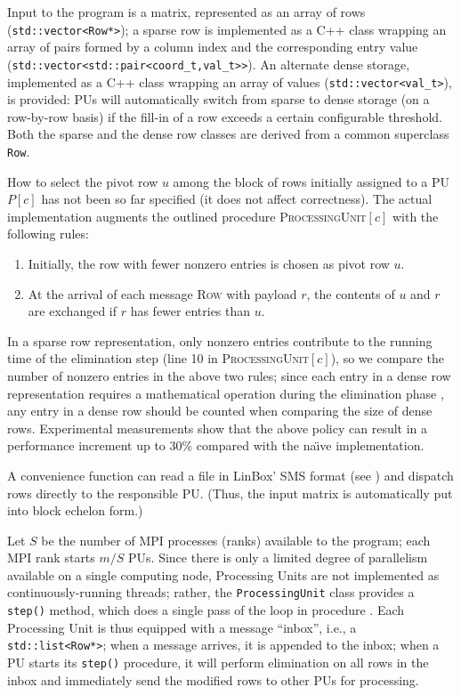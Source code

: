 Input to the program is a matrix, represented as an array of
rows (\verb"std::vector<Row*>"); a sparse row is implemented as a C++
class wrapping an array of pairs formed by a column index and the
corresponding entry value
(\verb"std::vector<std::pair<coord_t,val_t>>").  An alternate dense
storage, implemented as a C++ class wrapping an array of values
(\verb"std::vector<val_t>"), is provided: PUs will automatically
switch from sparse to dense storage (on a row-by-row basis) if the
fill-in of a row exceeds a certain configurable threshold.  Both the
sparse and the dense row classes are derived from a common superclass
\verb"Row".

How to select the pivot row $u$ among the block of rows initially
assigned to a PU $P[c]$ has not been so far specified (it does not
affect correctness).  The actual implementation augments the outlined
procedure \textsc{ProcessingUnit}$[c]$ with the following rules:
\begin{enumerate}
\item Initially, the row with fewer nonzero entries is chosen as pivot
  row $u$.
\item At the arrival of each message \textsc{Row} with payload $r$,
  the contents of $u$ and $r$ are exchanged if $r$ has fewer
  entries than $u$.
\end{enumerate}
In a sparse row representation, only nonzero entries contribute to the
running time of the elimination step (line 10 in
\textsc{ProcessingUnit}$[c]$), so we compare the number of nonzero
entries in the above two rules; since each entry in a dense row
representation requires a mathematical operation during the
elimination phase , any entry in a dense row should be counted when
comparing the size of dense rows.  Experimental measurements show that
the above policy can result in a performance increment up to 30\%
compared with the na\"{\i}ve implementation.

A convenience function can read a file in LinBox' SMS format (see
\cite{simc}) and dispatch rows directly to the responsible PU.  (Thus,
the input matrix is automatically put into block echelon form.)

Let $S$ be the number of MPI processes (ranks) available to the
program; each MPI rank starts $m/S$ PUs.  Since there is only a
limited degree of parallelism available on a single computing node,
Processing Units are not implemented as continuously-running threads;
rather, the \verb"ProcessingUnit" class provides a \verb"step()"
method, which does a single pass of the loop in procedure
.  Each Processing Unit is thus equipped with a
message ``inbox'', i.e., a \verb"std::list<Row*>"; when a 
message arrives, it is appended to the inbox; when a PU starts its
\verb"step()" procedure, it will perform elimination on all rows in
the inbox and immediately send the modified rows to other PUs for
processing.

